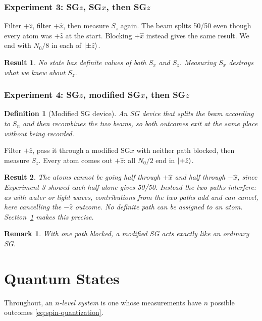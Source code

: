 \documentclass{article}
\newtheorem{definition}{Definition}
\newtheorem{remark}{Remark}
\newtheorem{result}{Result}
\begin{document}
\subsubsection{\texorpdfstring{Experiment 3: SG$z$, SG$x$, then SG$z$}{Experiment 3: SGz, SGx, then SGz}}
Filter $+\hat{z}$, filter $+\hat{x}$, then measure $S_z$ again. The beam splits 50/50 even though every atom was $+\hat{z}$ at the start. Blocking $+\hat{x}$ instead gives the same result. We end with $N_0/8$ in each of $\ket{\pm\hat{z}}$.
\begin{result}
    No state has definite values of both $S_x$ and $S_z$. Measuring $S_x$ destroys what we knew about $S_z$.
\end{result}

\subsubsection{\texorpdfstring{Experiment 4: SG$z$, modified SG$x$, then SG$z$}{Experiment 4: SGz, modified SGx, then SGz}}
\begin{definition}[Modified SG device]
    An SG device that splits the beam according to $S_n$ and then recombines the two beams, so both outcomes exit at the same place without being recorded.
\end{definition}
Filter $+\hat{z}$, pass it through a modified SG$x$ with neither path blocked, then measure $S_z$. Every atom comes out $+\hat{z}$: all $N_0/2$ end in $\ket{+\hat{z}}$.
\begin{result}
    The atoms cannot be going half through $+\hat{x}$ and half through $-\hat{x}$, since Experiment 3 showed each half alone gives 50/50. Instead the two paths \emph{interfere}: as with water or light waves, contributions from the two paths add and can cancel, here cancelling the $-\hat{z}$ outcome. No definite path can be assigned to an atom. Section~\ref{sec:states} makes this precise.
\end{result}
\begin{remark}
    With one path blocked, a modified SG acts exactly like an ordinary SG.
\end{remark}


\section{Quantum States}
\label{sec:states}
Throughout, an \emph{$n$-level system} is one whose measurements have $n$ possible outcomes \eqref{eq:spin-quantization}.
\end{document}
